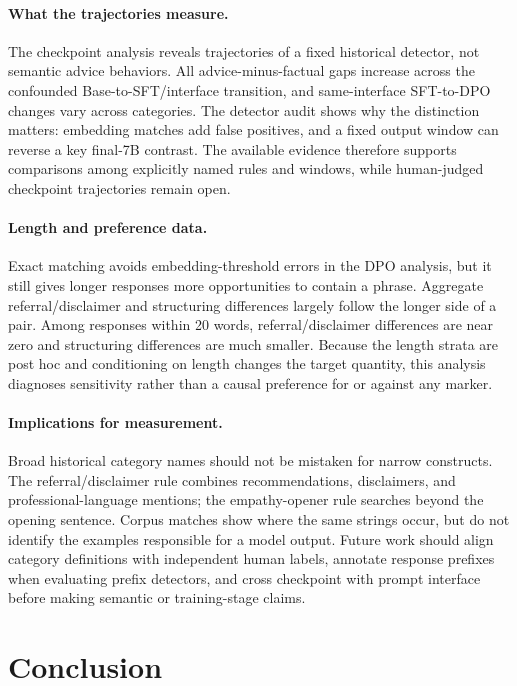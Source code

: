 \documentclass[11pt]{article}
\begin{document}
\paragraph{What the trajectories measure.}
The checkpoint analysis reveals trajectories of a fixed historical detector,
not semantic advice behaviors. All advice-minus-factual gaps increase across
the confounded Base-to-SFT/interface transition, and same-interface SFT-to-DPO
changes vary across categories. The detector audit shows why the distinction
matters: embedding matches add false positives, and a fixed output window can
reverse a key final-7B contrast. The available evidence therefore supports
comparisons among explicitly named rules and windows, while human-judged
checkpoint trajectories remain open.

\paragraph{Length and preference data.}
Exact matching avoids embedding-threshold errors in the DPO analysis, but it
still gives longer responses more opportunities to contain a phrase. Aggregate
referral/disclaimer and structuring differences largely follow the longer side
of a pair. Among responses within 20 words, referral/disclaimer differences are
near zero and structuring differences are much smaller. Because the length
strata are post hoc and conditioning on length changes the target quantity,
this analysis diagnoses sensitivity rather than a causal preference for or
against any marker.

\paragraph{Implications for measurement.}
Broad historical category names should not be mistaken for narrow constructs.
The referral/disclaimer rule combines recommendations, disclaimers, and
professional-language mentions; the empathy-opener rule searches beyond the
opening sentence. Corpus matches show where the same strings occur, but do not
identify the examples responsible for a model output. Future work should align
category definitions with independent human labels, annotate response prefixes
when evaluating prefix detectors, and cross checkpoint with prompt interface
before making semantic or training-stage claims.

\section{Conclusion}
\label{sec:roadmap}
\end{document}
